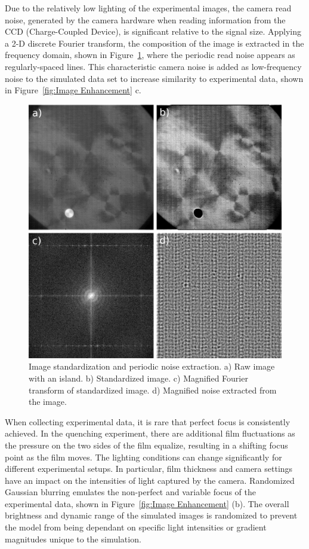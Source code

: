 \documentclass[twoside,twocolumn,9pt]{article}
\begin{document}
Due to the relatively low lighting of the experimental images, the camera read noise, generated by the camera hardware when reading information from the CCD (Charge-Coupled Device), is significant relative to the signal size. Applying a 2-D discrete Fourier transform, the composition of the image is extracted in the frequency domain\cite{kaur_periodic_2014}, shown in Figure~\ref{fig:Standardization and Noise}, where the periodic read noise appears as regularly-spaced lines. This characteristic camera noise is added as low-frequency noise to the simulated data set to increase similarity to experimental data, shown in Figure~\ref{fig:Image Enhancement} c.

\begin{figure}
  \includegraphics[width=\linewidth]{noiseExtraction.png}
  \caption{Image standardization and periodic noise extraction. a) Raw image with an island. b) Standardized image. c) Magnified Fourier transform of standardized image. d) Magnified noise extracted from the image.}
  \label{fig:Standardization and Noise}
\end{figure}

When collecting experimental data, it is rare that perfect focus is consistently achieved. In the quenching experiment, there are additional film fluctuations as the pressure on the two sides of the film equalize, resulting in a shifting focus point as the film moves. The lighting conditions can change significantly for different experimental setups. In particular, film thickness and camera settings have an impact on the intensities of light captured by the camera. Randomized Gaussian blurring emulates the non-perfect and variable focus of the experimental data, shown in Figure~\ref{fig:Image Enhancement} (b). The overall brightness and dynamic range of the simulated images is randomized to prevent the model from being dependant on specific light intensities or gradient magnitudes unique to the simulation.
\end{document}
